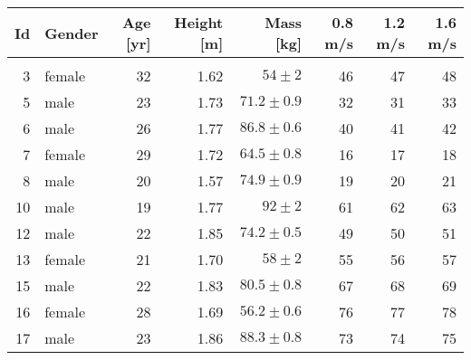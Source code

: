 \begin{tabular}{rlrrrrrr}
\toprule
 Id &  Gender &  Age [yr] & Height [m] &                     Mass [kg] & 0.8 m/s & 1.2 m/s & 1.6 m/s \\
\midrule
    &         &           &            &                               &         &         &         \\
  3 &  female &        32 &       1.62 &      $54\pm2$ &      46 &      47 &      48 \\
  5 &    male &        23 &       1.73 &  $71.2\pm0.9$ &      32 &      31 &      33 \\
  6 &    male &        26 &       1.77 &  $86.8\pm0.6$ &      40 &      41 &      42 \\
  7 &  female &        29 &       1.72 &  $64.5\pm0.8$ &      16 &      17 &      18 \\
  8 &    male &        20 &       1.57 &  $74.9\pm0.9$ &      19 &      20 &      21 \\
 10 &    male &        19 &       1.77 &      $92\pm2$ &      61 &      62 &      63 \\
 12 &    male &        22 &       1.85 &  $74.2\pm0.5$ &      49 &      50 &      51 \\
 13 &  female &        21 &       1.70 &      $58\pm2$ &      55 &      56 &      57 \\
 15 &    male &        22 &       1.83 &  $80.5\pm0.8$ &      67 &      68 &      69 \\
 16 &  female &        28 &       1.69 &  $56.2\pm0.6$ &      76 &      77 &      78 \\
 17 &    male &        23 &       1.86 &  $88.3\pm0.8$ &      73 &      74 &      75 \\
\bottomrule
\end{tabular}
